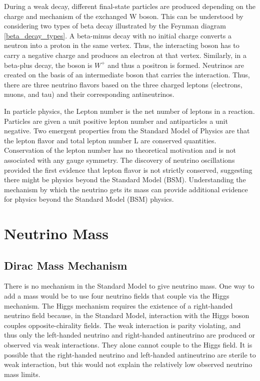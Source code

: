 
During a weak decay, different final-state particles are produced depending on the charge and mechanism of the exchanged W boson. This can be understood by considering two types of beta decay illustrated by the Feynman diagram \ref{beta_decay_types}. A beta-minus decay with no initial charge converts a neutron into a proton in the same vertex. Thus, the interacting boson has to carry a negative charge and produces an electron at that vertex. Similarly, in a beta-plus decay, the boson is $W^+$ and thus a positron is formed. Neutrinos are created on the basis of an intermediate boson that carries the interaction. Thus, there are three neutrino flavors based on the three charged leptons (electrons, muons, and tau) and their corresponding antineutrinos. 




In particle physics, the Lepton number is the net number of leptons in a reaction. Particles are given a unit positive lepton number and antiparticles a unit negative. Two emergent properties from the Standard Model of Physics are that the lepton flavor and total lepton number L are conserved quantities. Conservation of the lepton number has no theoretical motivation and is not associated with any gauge symmetry. The discovery of neutrino oscillations provided the first evidence that lepton flavor is not strictly conserved, suggesting there might be physics beyond the Standard Model (BSM). Understanding the mechanism by which the neutrino gets its mass can provide additional evidence for physics beyond the Standard Model (BSM) physics. 

\section{Neutrino Mass}
\subsection{Dirac Mass Mechanism}
There is no mechanism in the Standard Model to give neutrino mass. One way to add a mass would be to use four neutrino fields that couple via the Higgs mechanism. The Higgs mechanism requires the existence of a right-handed neutrino field because, in the Standard Model, interaction with the Higgs boson couples opposite-chirality fields. The weak interaction is parity violating, and thus only the left-handed neutrino and right-handed antineutrino are produced or observed via weak interactions. They alone cannot couple to the Higgs field. It is possible that the right-handed neutrino and left-handed antineutrino are sterile to weak interaction, but this would not explain the relatively low observed neutrino mass limits. 

